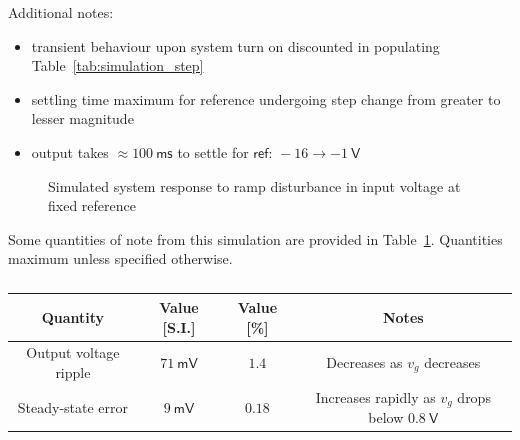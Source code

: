 Additional notes:
\begin{itemize}
    \item transient behaviour upon system turn on discounted in populating Table~\ref{tab:simulation_step}
    \item settling time maximum for reference undergoing step change from greater to lesser magnitude
    \item output takes $\approx 100 \ \mathsf{ms}$ to settle for $\textsf{ref: } \minus 16 \rightarrow \minus 1 \ \mathsf{V}$
\end{itemize}
\begin{figure}[H]
    \centering
    \caption{Simulated system response to ramp disturbance in input voltage at fixed reference}
    \label{fig:simulation_ramp}
\end{figure}
Some quantities of note from this simulation are provided in Table~\ref{tab:simulation_ramp}. Quantities maximum unless specified otherwise.
\begin{table}[H]
    \centering
    \begin{tabular}{|c|c|c|c|}
    \hline
    Quantity & Value [S.I.] & Value [\%] & Notes\\
    \hline
    Output voltage ripple & $71 \ \mathsf{mV}$ & $1.4$ & Decreases as $v_g$ decreases\\
    \hline
    Steady-state error & $9 \ \mathsf{mV}$ & $0.18$ & Increases rapidly as $v_g$ drops below $0.8 \ \mathsf{V}$\\
    \hline
    \end{tabular}
    \caption{}
    \label{tab:simulation_ramp}
\end{table}
